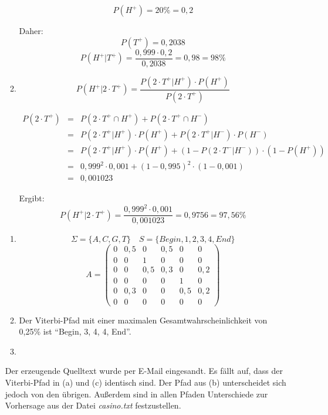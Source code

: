 \documentclass{homework}
\begin{document}
\begin{enumerate}
\begin{enumerate}
$$P(H^+) = 20\% = 0,2$$

Daher:
$$P(T^+) = 0,2038$$
$$P(H^+ | T^+) = \frac{0,999\cdot0,2}{0,2038} = 0,98 = 98\%$$

\item
	$$P(H^+ | 2\cdot T^+) = \frac{P(2\cdot T^+| H^+) \cdot P(H^+)}{P(2\cdot T^+)} $$

\begin{eqnarray*}
P(2\cdot T^+)
& = & P(2\cdot T^+ \cap H^+) + P(2\cdot T^+ \cap H^-) \\ 
& = & P(2\cdot T^+ | H^+) \cdot P(H^+) + P(2\cdot T^+ | H^-) \cdot P(H^-) \\ 
& = & P(2\cdot T^+ | H^+) \cdot P(H^+) + (1-P(2\cdot T^- | H^-)) \cdot (1-P(H^+))\\
& = & 0,999^2 \cdot 0,001 + (1-0,995)^2\cdot(1-0,001)\\
& = & 0,001023
\end{eqnarray*}

Ergibt: \\
$$P(H^+ | 2\cdot T^+) = \frac{0,999^2\cdot0,001}{0,001023} = 0,9756 = 97,56\%$$
\end{enumerate}


\begin{enumerate}
\item $$\Sigma = \{A, C, G, T\} \quad S = \{Begin, 1, 2, 3, 4, End\}$$
$$A = \begin{pmatrix}
0	& 0,5	& 0		& 0,5	& 0		& 0\\
0	& 0		& 1		& 0		& 0		& 0\\
0	& 0		& 0,5	& 0,3	& 0		& 0,2\\
0	& 0		& 0		& 0		& 1		& 0\\
0	& 0,3	& 0		& 0		& 0,5	& 0,2\\
0	& 0		& 0		& 0		& 0		& 0
\end{pmatrix}$$

\item Der Viterbi-Pfad mit einer maximalen Gesamtwahrscheinlichkeit von 0,25\%
ist "`Begin, 3, 4, 4, End"'.

\item 

\end{enumerate}


Der erzeugende Quelltext wurde per E-Mail eingesandt.
Es fällt auf, dass der Viterbi-Pfad in (a) und (c) identisch sind. Der Pfad aus
(b) unterscheidet sich jedoch von den übrigen. Außerdem sind in allen Pfaden
Unterschiede zur Vorhersage aus der Datei \textit{casino.txt} festzustellen.


\end{enumerate}
\end{document}

